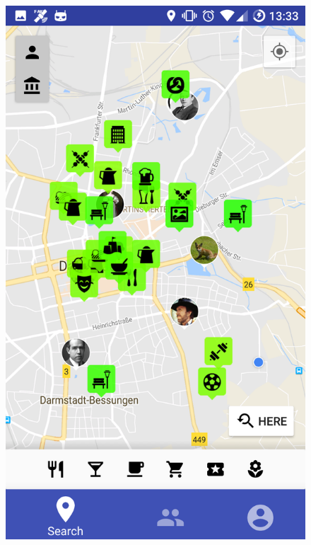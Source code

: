 \documentclass[11pt, accentcolor=tud1c]{tudreport}
\begin{document}
\begin{figure}[h]
\centering
\begin{minipage}{.3\textwidth}
  \centering
  \includegraphics[width=.8\linewidth]{./res/map_user_venues.png}
  \label{fig:map_view}
\end{minipage}%
\begin{minipage}{.3\textwidth}
  \centering

\end{minipage}
\end{figure}
\end{document}
